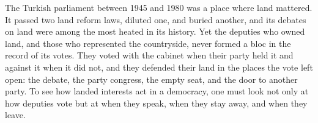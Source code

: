 \documentclass[12pt]{article}
\begin{document}
The Turkish parliament between 1945 and 1980 was a place where land mattered. It passed two land reform laws, diluted one, and buried another, and its debates on land were among the most heated in its history. Yet the deputies who owned land, and those who represented the countryside, never formed a bloc in the record of its votes. They voted with the cabinet when their party held it and against it when it did not, and they defended their land in the places the vote left open: the debate, the party congress, the empty seat, and the door to another party. To see how landed interests act in a democracy, one must look not only at how deputies vote but at when they speak, when they stay away, and when they leave.

\newpage
\singlespacing
\theendnotes

\newpage



\newpage
\appendix

\end{document}
